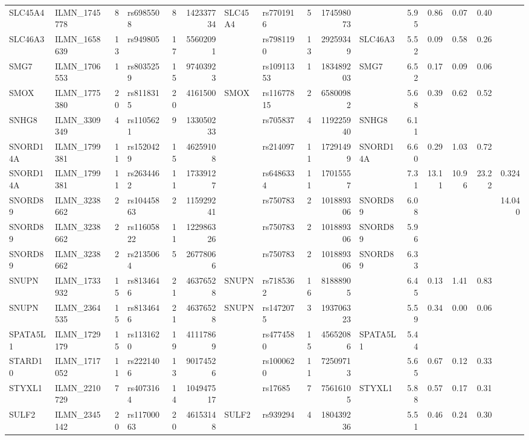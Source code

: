 \documentclass{article}
\begin{document}
\begin{landscape}
{\begin{ThreePartTable}
\begin{longtable}{|llr|lrrl|lrrl|rrrr|r|}
SLC45A4 & ILMN\_1745778 & 8 & rs6985508 & 8 & 142337734 & SLC45A4 & rs7701916 & 5 & 174598073 &  & 5.95 & 0.86 & 0.07 & 0.40 &  \\
SLC46A3 & ILMN\_1658639 & 13 & rs949805 & 17 & 55602091 &  & rs7981190 & 13 & 29259349 & SLC46A3 & 5.52 & 0.09 & 0.58 & 0.26 &  \\
SMG7 & ILMN\_1706553 & 1 & rs8035259 & 15 & 97403923 &  & rs10911353 & 1 & 183489203 & SMG7 & 6.52 & 0.17 & 0.09 & 0.06 &  \\
SMOX & ILMN\_1775380 & 20 & rs8118315 & 20 & 4161500 & SMOX & rs11677815 & 2 & 65800982 &  & 5.68 & 0.39 & 0.62 & 0.52 &  \\
SNHG8 & ILMN\_3309349 & 4 & rs1105621 & 9 & 133050233 &  & rs705837 & 4 & 119225940 & SNHG8 & 6.11 &  &  &  &  \\
SNORD14A & ILMN\_1799381 & 11 & rs1520429 & 15 & 46259108 &  & rs214097 & 11 & 17291499 & SNORD14A & 6.60 & 0.29 & 1.03 & 0.72 &  \\
SNORD14A & ILMN\_1799381 & 11 & rs2634462 & 11 & 17339127 &  & rs6486334 & 11 & 17015557 &  & 7.31 & 13.11 & 10.96 & 23.22 & 0.324 \\
SNORD89 & ILMN\_3238662 & 2 & rs10445863 & 2 & 115929241 &  & rs750783 & 2 & 101889306 & SNORD89 & 6.08 &  &  &  & 14.040 \\
SNORD89 & ILMN\_3238662 & 2 & rs11605822 & 11 & 122986326 &  & rs750783 & 2 & 101889306 & SNORD89 & 5.96 &  &  &  &  \\
SNORD89 & ILMN\_3238662 & 2 & rs2135064 & 5 & 26778066 &  & rs750783 & 2 & 101889306 & SNORD89 & 6.33 &  &  &  &  \\
SNUPN & ILMN\_1733932 & 15 & rs8134646 & 21 & 46376528 & SNUPN & rs7185362 & 16 & 81888905 &  & 6.45 & 0.13 & 1.41 & 0.83 &  \\
SNUPN & ILMN\_2364535 & 15 & rs8134646 & 21 & 46376528 & SNUPN & rs1472075 & 3 & 193706323 &  & 5.59 & 0.34 & 0.00 & 0.06 &  \\
SPATA5L1 & ILMN\_1729179 & 15 & rs1131620 & 19 & 41117869 &  & rs4774580 & 15 & 45652086 & SPATA5L1 & 5.44 &  &  &  &  \\
STARD10 & ILMN\_1717052 & 11 & rs2221406 & 13 & 90174526 &  & rs1000620 & 11 & 72509713 &  & 5.65 & 0.67 & 0.12 & 0.33 &  \\
STYXL1 & ILMN\_2210729 & 7 & rs4073164 & 14 & 104947517 &  & rs17685 & 7 & 75616105 & STYXL1 & 5.88 & 0.57 & 0.17 & 0.31 &  \\
SULF2 & ILMN\_2345142 & 20 & rs11700063 & 20 & 46153148 & SULF2 & rs939294 & 4 & 180439236 &  & 5.51 & 0.46 & 0.24 & 0.30 &  \\

\end{longtable}
\end{ThreePartTable}}
\end{landscape}
\end{document}
